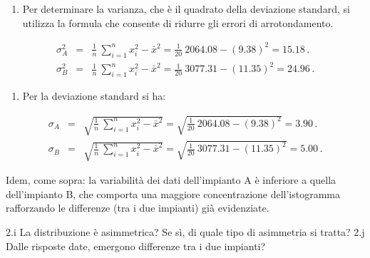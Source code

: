 \documentclass[
  11pt,
]{book}
\providecommand{\tightlist}{%
  \setlength{\itemsep}{0pt}\setlength{\parskip}{0pt}}
\theoremstyle{mytheoremstyle}
\theoremstyle{mydefstyle}
\newenvironment{sol}
  {
  \begin{tcolorbox}[enhanced,breakable,arc=0.1mm,boxrule=1pt,colback=white,colframe=iblue,
  title=\bf \fontfamily{lmss}\selectfont \hspace{.5 cm} Soluzione,drop fuzzy shadow]

}{
\end{tcolorbox}
  }
\begin{document}
\begin{sol}

\begin{enumerate}
\def\labelenumi{\alph{enumi}.}
\setcounter{enumi}{6}
\tightlist
\item
  Per determinare la varianza, che è il quadrato della deviazione
  standard, si utilizza la formula che consente di ridurre gli errori
  di arrotondamento.
\end{enumerate}

\begin{eqnarray*}
\sigma_{A}^{2} &=& \frac{1} {n}\ \sum_{i=1}^{n} x_{i}^{2} - \bar{x}^{2}
                =  \frac{1} {20}\ 2064.08 - (9.38)^{2} = 15.18 \,. \\
\sigma_{B}^{2} &=& \frac{1} {n}\ \sum_{i=1}^{n} x_{i}^{2} - \bar{x}^{2}
                =  \frac{1} {20}\ 3077.31 - (11.35)^{2} = 24.96 \,.
\end{eqnarray*}

\begin{enumerate}
\def\labelenumi{\alph{enumi}.}
\setcounter{enumi}{7}
\tightlist
\item
  Per la deviazione standard si ha:
\end{enumerate}

\begin{eqnarray*}
\sigma_{A} &=& \sqrt{ \frac{1} {n}\ \sum_{i=1}^{n} x_{i}^{2} - \bar{x}^{2} }
            =  \sqrt{ \frac{1} {20}\ 2064.08 - (9.38)^{2} } = 3.90 \,. \\
\sigma_{B} &=& \sqrt{ \frac{1} {n}\ \sum_{i=1}^{n} x_{i}^{2} - \bar{x}^{2} }
            =  \sqrt{ \frac{1} {20}\ 3077.31 - (11.35)^{2} } = 5.00 \,.
\end{eqnarray*}

Idem, come sopra: la variabilità dei dati dell'impianto A è
inferiore a quella dell'impianto B, che comporta una maggiore
concentrazione dell'istogramma rafforzando le differenze (tra i
due impianti) già evidenziate.

\end{sol}

2.i La distribuzione è asimmetrica?
Se sì, di quale tipo di asimmetria si tratta?
2.j Dalle risposte date, emergono differenze tra i due impianti?
\end{document}
